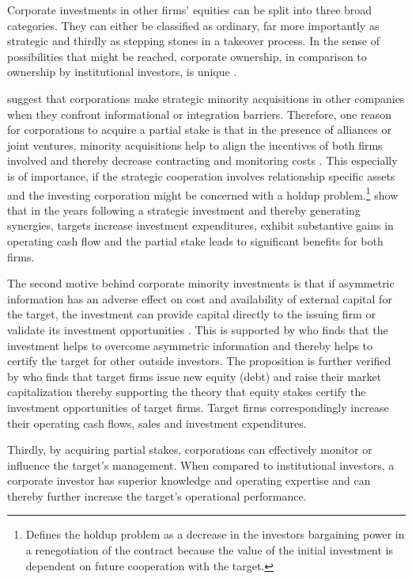 \documentclass[12pt]{article}
\begin{document}
\noindent Corporate investments in other firms' equities can be split into three broad categories. They can either be classified as ordinary, far more importantly as strategic and thirdly as stepping stones in a takeover process. 
In the sense of possibilities that might be reached, corporate ownership, in comparison to ownership by institutional investors, is unique \citep[p.2791]{Allen2000}.\par
\citet[p.1]{Huang2017} suggest that corporations make strategic minority acquisitions in other companies when they confront informational or integration barriers. 
Therefore, one reason for corporations to acquire a partial stake is that in the presence of alliances or joint ventures, minority acquisitions help to align the incentives of both firms involved and thereby decrease contracting and monitoring costs \citep[p.2792]{Allen2000}. This especially is of importance, if the strategic cooperation involves relationship specific assets and the investing corporation might be concerned with a holdup problem.\footnote{\citet[p.1023]{Ouimet2013} Defines the holdup problem as a decrease in the investors bargaining power in a renegotiation of the contract because the value of the initial investment is dependent on future cooperation with the target.} \citet[p. 2793]{Allen2000} show that in the years following a strategic investment and thereby generating synergies,  targets increase investment expenditures, exhibit substantive gains in operating cash flow and the partial stake leads to significant benefits for both firms.\par
The second motive behind corporate minority investments is that if asymmetric information has an adverse effect on cost and availability of external capital for the target, the investment can provide capital directly to the issuing firm or validate its investment opportunities \citep[p.2792]{Allen2000}. This is supported by \citet[p.1038]{Ouimet2013} who finds that the investment helps to overcome asymmetric information and thereby helps to certify the target for other outside investors. The proposition is further verified by \citet[p.78]{Liao2014} who finds that target firms issue new equity (debt) and raise their market capitalization thereby supporting the theory that equity stakes certify the investment opportunities of target firms. Target firms correspondingly increase their operating cash flows, sales and investment expenditures.\par
Thirdly, by acquiring partial stakes, corporations can effectively monitor or influence the target's management. When compared to institutional investors, a corporate investor has superior knowledge and operating expertise \citep[p.2792]{Allen2000} and can thereby further increase the target's operational performance.\par
\end{document}
